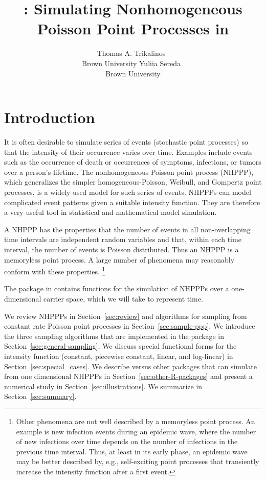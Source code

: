 \documentclass[article,nojss]{jss}\usepackage[]{graphicx}\usepackage[]{xcolor}
\author{Thomas A. Trikalinos~\orcidlink{0000-0002-3990-1848}\\Brown University
   \And Yuliia Sereda~\orcidlink{https://orcid.org/0000-0002-4017-4561}\\Brown University}
\title{\pkg{nhppp}: Simulating Nonhomogeneous Poisson Point Processes in \proglang{R}}
\begin{document}
\section{Introduction} \label{sec:intro}

It is often desirable to simulate series of events (stochastic point processes) so that the intensity of their occurrence varies over time. Examples include events such as the occurrence of death or occurrences of symptoms, infections, or tumors over a person's lifetime. The nonhomogeneous Poisson point process (NHPPP), which generalizes the simpler homogeneous-Poisson, Weibull, and Gompertz point processes, is a widely used model for such series of events. NHPPPs can model complicated event patterns given a suitable intensity function. They are therefore a very useful tool in statistical and mathematical model simulation.

A NHPPP has the properties that the number of events in all non-overlapping time intervals are independent random variables and that, within each time interval, the number of events is Poisson distributed. Thus an NHPPP is a memoryless point process. A large number of phenomena may reasonably conform with these properties.%
\footnote{Other phenomena are not well described by a memoryless point process. An example is new infection events during an epidemic wave, where the number of new infections over time depends on the number of infections in the previous time interval.  Thus, at least in its early phase, an epidemic wave may be better described by, e.g., self-exciting point processes that transiently increase the intensity function after a first event.}

The  package in  contains functions for the simulation of NHPPPs over a one-dimensional carrier space, which we will take to represent time.

We review NHPPPs in Section~\ref{sec:review} and algorithms for sampling from constant rate Poisson point processes in Section~\ref{sec:sample-ppp}. We introduce the three sampling algorithms that are implemented in the package in Section~\ref{sec:general-sampling}. We discuss special functional forms for the intensity function (constant, piecewise constant, linear, and log-linear) in Section~\ref{sec:special_cases}. We describe  versus other  packages that can simulate from one dimensional NHPPPs in Section~\ref{sec:other-R-packages} and present a numerical study in Section~\ref{sec:illustrations}. We summarize in Section~\ref{sec:summary}.
\end{document}
